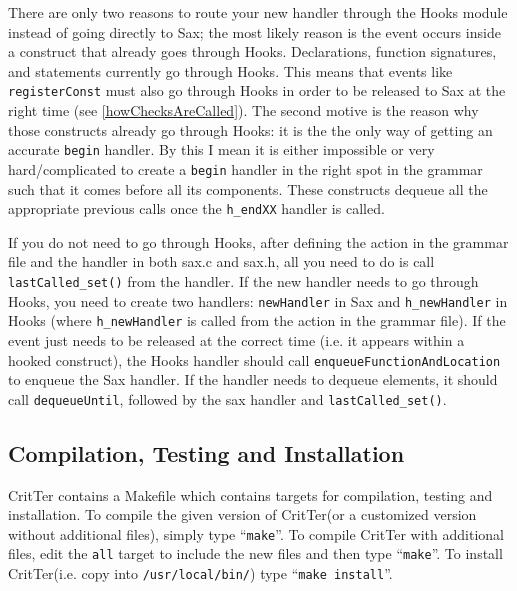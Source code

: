 \documentclass[12pt]{report}
\newcommand{\programName}{CritTer\xspace}
\begin{document}
There are only two reasons to route your new handler through the Hooks module instead of going 
directly to Sax; the most likely reason is the event occurs inside a construct that already goes through 
Hooks. Declarations, function signatures, and statements currently go through Hooks. This means that 
events like \lstinline{registerConst} must also go through Hooks in order to be released to Sax at the right 
time (see \autoref{howChecksAreCalled}). The second motive is the reason why those constructs 
already go through Hooks:  it is the the only way of getting an accurate \lstinline{begin} handler. By this I 
mean it is either impossible or very hard\slash complicated to create a \lstinline{begin} handler in the 
right spot in the grammar such that it comes before all its components. These constructs dequeue all the 
appropriate previous calls once the \lstinline{h_endXX} handler is called.

If you do not need to go through Hooks, after defining the action in the grammar file and the handler in 
both sax.c and sax.h, all you need to do is call \lstinline{lastCalled_set()} from the handler. If the new 
handler needs to go through Hooks, you need to create two handlers: \lstinline{newHandler} in Sax and 
\lstinline{h_newHandler} in Hooks (where \lstinline{h_newHandler} is called from the action in the 
grammar file). If the event just needs to be released at the correct time (i.e. it appears within a hooked 
construct), the Hooks handler should call \lstinline{enqueueFunctionAndLocation} to enqueue the Sax 
handler. If the handler needs to dequeue elements, it should call \lstinline{dequeueUntil}, followed by the 
sax handler and \lstinline{lastCalled_set()}.

\subsection{Compilation, Testing and Installation}

\programName contains a Makefile which contains targets for compilation, testing and installation. To 
compile the given version of \programName (or a customized version without additional files), simply 
type ``\lstinline{make}''. To compile \programName with additional files, edit the \lstinline{all} target to 
include the new files and then type ``\lstinline{make}''. To install \programName (i.e. copy into 
\lstinline{/usr/local/bin/}) type ``\lstinline{make install}''.
\end{document}
